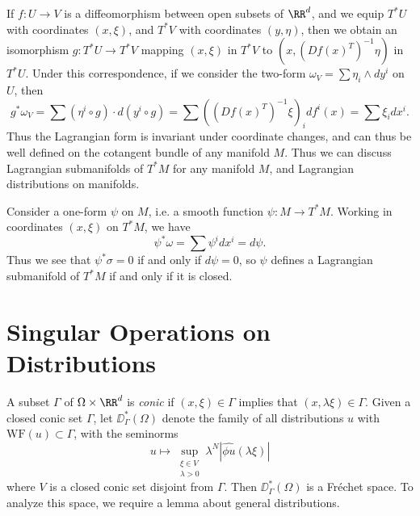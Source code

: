 If $f: U \to V$ is a diffeomorphism between open subsets of $\RR^d$, and we equip $T^* U$ with coordinates $(x,\xi)$, and $T^* V$ with coordinates $(y,\eta)$, then we obtain an isomorphism $g: T^* U \to T^* V$ mapping $(x,\xi)$ in $T^* V$ to $(x, (Df(x)^T)^{-1} \eta)$ in $T^* U$. Under this correspondence, if we consider the two-form $\omega_V = \sum \eta_i \wedge dy^i$ on $U$, then
%
\[ g^* \omega_V = \sum (\eta^i \circ g) \cdot d(y^i \circ g) = \sum ((Df(x)^T)^{-1} \xi)_i df^i(x) = \sum \xi_i dx^i. \]
%
Thus the Lagrangian form is invariant under coordinate changes, and can thus be well defined on the cotangent bundle of any manifold $M$. Thus we can discuss Lagrangian submanifolds of $T^* M$ for any manifold $M$, and Lagrangian distributions on manifolds.

\begin{example}
    Consider a one-form $\psi$ on $M$, i.e. a smooth function $\psi: M \to T^* M$. Working in coordinates $(x,\xi)$ on $T^* M$, we have
    \[ \psi^* \omega = \sum \psi^i dx^i = d\psi. \]
    Thus we see that $\psi^* \sigma = 0$ if and only if $d\psi = 0$, so $\psi$ defines a Lagrangian submanifold of $T^* M$ if and only if it is closed.
\end{example}

\section{Singular Operations on Distributions}

A subset $\Gamma$ of $\Omega \times \RR^d$ is \emph{conic} if $(x,\xi) \in \Gamma$ implies that $(x,\lambda \xi) \in \Gamma$. Given a closed conic set $\Gamma$, let $\DD^*_\Gamma(\Omega)$ denote the family of all distributions $u$ with $\text{WF}(u) \subset \Gamma$, with the seminorms
%
\[ u \mapsto \sup_{\substack{\xi \in V\\\lambda > 0}} \lambda^N |\widehat{\phi u}(\lambda \xi)| \]
%
where $V$ is a closed conic set disjoint from $\Gamma$. Then $\DD^*_\Gamma(\Omega)$ is a Fr\'{e}chet space. To analyze this space, we require a lemma about general distributions.

